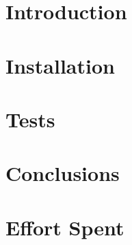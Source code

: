 \documentclass [11pt,twoside]{article}
\begin{document}
  
    
    \setcounter{page}{2}
    \newpage
    \tableofcontents
    \newpage
    \listoffigures
    \newpage

    \listoftables
    \clearpage
    \section{Introduction}
    \label{sect:introduction}
    
    \clearpage
    \section{Installation}
    \label{sect:installation}
     

    \clearpage
    \section{Tests}
    \label{sect:tests}
     
    \clearpage
    \section{Conclusions}
    \label{sect:tests}
     
    \clearpage
    \section{Effort Spent}
    \label{sect:effortspent}
     
    
\end{document}
